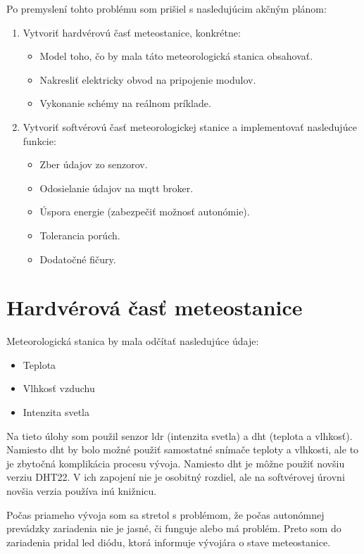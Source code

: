 Po premyslení tohto problému som prišiel s nasledujúcim akčným plánom:
\begin{enumerate}
    \item Vytvoriť hardvérovú časť meteostanice, konkrétne:
    \begin{itemize}
        \item Model toho, čo by mala táto meteorologická stanica obsahovať.
        \item Nakresliť elektricky obvod na pripojenie modulov.
        \item Vykonanie schémy na reálnom príklade.
    \end{itemize}
    \item Vytvoriť softvérovú časť meteorologickej stanice a implementovať nasledujúce funkcie:
    \begin{itemize}
        \item Zber údajov zo senzorov.
        \item Odosielanie údajov na \gls{mqtt} broker.
        \item Úspora energie (zabezpečiť možnosť autonómie).
        \item Tolerancia porúch.
        \item Dodatočné fičury.
    \end{itemize}
\end{enumerate}


\section{Hardvérová časť meteostanice}
Meteorologická stanica by mala odčítať nasledujúce údaje: 
\begin{itemize}
    \item Teplota
    \item Vlhkosť vzduchu
    \item Intenzita svetla
\end{itemize}
Na tieto úlohy som použil senzor \gls{ldr} (intenzita svetla) a \gls{dht} (teplota a vlhkosť). Namiesto \gls{dht} by bolo možné použiť samostatné snímače teploty a vlhkosti, ale to je zbytočná komplikácia procesu vývoja. Namiesto \gls{dht} je môžne použiť novšiu verziu DHT22. V ich zapojení nie je osobitný rozdiel, ale na softvérovej úrovni novšia verzia používa inú knižnicu.

Počas priameho vývoja som sa stretol s problémom, že počas autonómnej prevádzky zariadenia nie je jasné, či funguje alebo má problém. Preto som do zariadenia pridal \gls{led} diódu, ktorá informuje vývojára o stave meteostanice.

